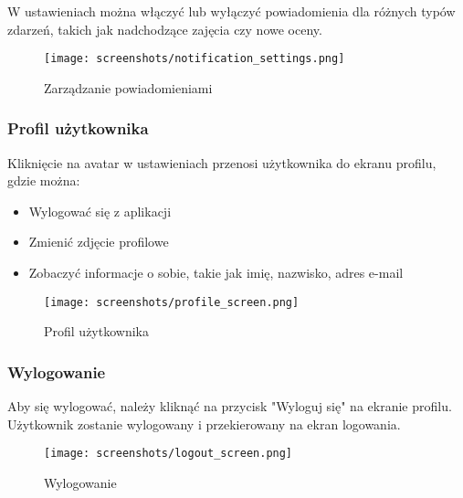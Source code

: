 W ustawieniach można włączyć lub wyłączyć powiadomienia dla różnych typów zdarzeń, takich jak nadchodzące zajęcia czy nowe oceny.

\begin{figure}[h!]
  \centering
  \texttt{[image: screenshots/notification\_settings.png]}
  \caption{Zarządzanie powiadomieniami}
  \label{fig:notification_settings}
\end{figure}

\subsubsection{Profil użytkownika}

Kliknięcie na avatar w ustawieniach przenosi użytkownika do ekranu profilu, gdzie można:

\begin{itemize}
  \item Wylogować się z aplikacji
  \item Zmienić zdjęcie profilowe
  \item Zobaczyć informacje o sobie, takie jak imię, nazwisko, adres e-mail
\end{itemize}

\begin{figure}[h!]
  \centering
  \texttt{[image: screenshots/profile\_screen.png]}
  \caption{Profil użytkownika}
  \label{fig:profile_screen}
\end{figure}

\subsubsection{Wylogowanie}

Aby się wylogować, należy kliknąć na przycisk "Wyloguj się" na ekranie profilu. Użytkownik zostanie wylogowany i przekierowany na ekran logowania.

\begin{figure}[h!]
  \centering
  \texttt{[image: screenshots/logout\_screen.png]}
  \caption{Wylogowanie}
  \label{fig:logout_screen}
\end{figure}